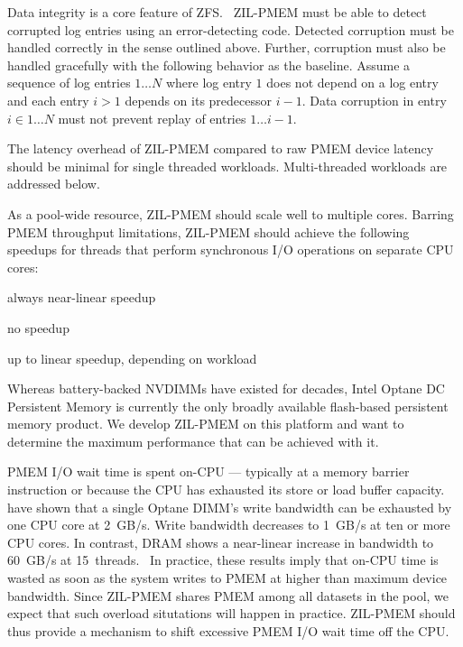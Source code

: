 \documentclass[12pt,a4paper,twoside,draft]{book}
\begin{document}
Data integrity is a core feature of ZFS.~\cite{zfspaper}
ZIL-PMEM must be able to detect corrupted log entries using an error-detecting code.
Detected corruption must be handled correctly in the sense outlined above.
Further, corruption must also be handled gracefully with the following behavior as the baseline.
Assume a sequence of log entries $1 \dots N$ where log entry $1$ does not depend on a log entry and each entry $i > 1$ depends on its predecessor $i-1$.
Data corruption in entry $i \in 1 \dots N$ must not prevent replay of entries $1 \dots i-1$.

The latency overhead of ZIL-PMEM compared to raw PMEM device latency should be minimal for single threaded workloads.
Multi-threaded workloads are addressed below.

As a pool-wide resource, ZIL-PMEM should scale well to multiple cores.
Barring PMEM throughput limitations, ZIL-PMEM should achieve the following speedups for threads that perform synchronous I/O operations on separate CPU cores:
{
\setlength{\parskip}{0pt}
\begin{description}[topsep=0pt, noitemsep, leftmargin=1cm, labelindent=1cm, widest=1 private dataset per thread]
    \item[1 private dataset per thread] always near-linear speedup
    \item[1 shared dataset] \mbox{}
          \begin{description}[noitemsep, leftmargin=1cm, labelindent=1cm, widest=ZPL file system]
              \item[ZPL file system] no speedup
              \item[ZVOL] up to linear speedup, depending on workload
          \end{description}
\end{description}
}

Whereas battery-backed NVDIMMs have existed for decades, Intel Optane DC Persistent Memory is currently the only broadly available flash-based persistent memory product.
We develop ZIL-PMEM on this platform and want to determine the maximum performance that can be achieved with it.

PMEM I/O wait time is spent on-CPU --- typically at a memory barrier instruction or because the CPU has exhausted its store or load buffer capacity.
\citeauthor{yang_empirical_2020} have shown that a single Optane DIMM's write bandwidth can be exhausted by one CPU core at \SI{2}{GB/s}.
Write bandwidth decreases to \SI{1}{GB/s} at ten or more CPU cores.
In contrast, DRAM shows a near-linear increase in bandwidth to \SI{60}{GB/s} at \SI{15}{threads}.~\cite[fig.4]{yang_empirical_2020}
In practice, these results imply that on-CPU time is wasted as soon as the system writes to PMEM at higher than maximum device bandwidth.
Since ZIL-PMEM shares PMEM among all datasets in the pool, we expect that such overload situtations will happen in practice.
ZIL-PMEM should thus provide a mechanism to shift excessive PMEM I/O wait time off the CPU.
\end{document}
